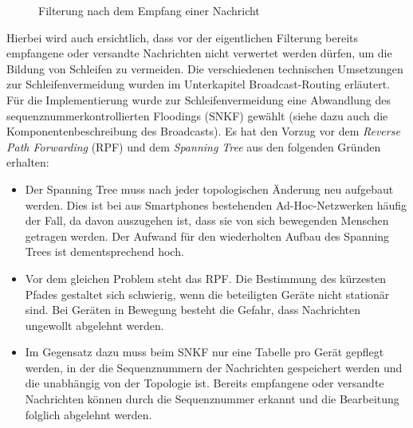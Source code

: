 \begin{figure}[H]
	\centering
	\caption{Filterung nach dem Empfang einer Nachricht}
	\label{fig:empfangNachricht}
\end{figure}
Hierbei wird auch ersichtlich, dass vor der eigentlichen Filterung bereits empfangene oder versandte Nachrichten nicht verwertet werden dürfen, um die Bildung von Schleifen zu vermeiden. Die verschiedenen technischen Umsetzungen zur Schleifenvermeidung wurden im Unterkapitel Broadcast-Routing erläutert. 
\\Für die Implementierung wurde zur Schleifenvermeidung eine Abwandlung des sequenznummerkontrollierten Floodings (SNKF) gewählt (siehe dazu auch die Komponentenbeschreibung des Broadcasts). Es hat den Vorzug vor dem \textit{Reverse Path Forwarding} (RPF) und dem \textit{Spanning Tree} aus den folgenden Gründen erhalten:
\begin{itemize}
	\item Der Spanning Tree muss nach jeder topologischen Änderung neu aufgebaut werden. Dies ist bei aus Smartphones bestehenden Ad-Hoc-Netzwerken häufig der Fall, da davon auszugehen ist, dass sie von sich bewegenden Menschen getragen werden. Der Aufwand für den wiederholten Aufbau des Spanning Trees ist dementsprechend hoch.
	\item Vor dem gleichen Problem steht das RPF. Die Bestimmung des kürzesten Pfades gestaltet sich schwierig, wenn die beteiligten Geräte nicht stationär sind. Bei Geräten in Bewegung besteht die Gefahr, dass Nachrichten ungewollt abgelehnt werden.
	\item Im Gegensatz dazu muss beim SNKF nur eine Tabelle pro Gerät gepflegt werden, in der die Sequenznummern der Nachrichten gespeichert werden und die unabhängig von der Topologie ist. Bereits empfangene oder versandte Nachrichten können durch die Sequenznummer erkannt und die Bearbeitung folglich abgelehnt werden.
\end{itemize}
